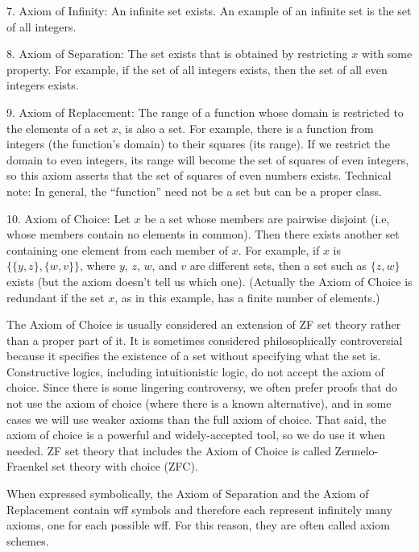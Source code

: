 7. Axiom of Infinity:  An infinite set exists.  An example of an infinite
   set is the set of all
   integers.

8. Axiom of Separation:  The set exists that is obtained by restricting $x$
   with some property.  For example, if the set of all integers exists,
   then the set of all even integers exists.

9. Axiom of Replacement:  The range of a function whose domain is restricted
   to the elements of a set $x$, is also a set.  For example, there
   is a function
   from integers (the function's domain) to their squares (its
   range).  If we
   restrict the domain to even integers, its range will become the set of
   squares of even integers, so this axiom asserts that the set of
    squares of even numbers exists.  Technical note:  In general, the
   ``function'' need not be a set but can be a proper class.

10. Axiom of Choice:  Let $x$ be a set whose members are pairwise
  disjoint (i.e,
  whose members contain no elements in common).  Then there exists another
  set containing one element from each member of $x$.  For
  example, if $x$ is
  $\{\{y,z\},\{w,v\}\}$, where $y$, $z$, $w$, and $v$ are
  different sets, then a set such as $\{z,w\}$
  exists (but the axiom doesn't tell
  us which one).  (Actually the Axiom
  of Choice is redundant if the set $x$, as in this example, has a finite
  number of elements.)

The Axiom of Choice is usually considered an extension of ZF set theory rather
than a proper part of it.  It is sometimes considered philosophically
controversial because it specifies the existence of a set without specifying
what the set is. Constructive logics, including intuitionistic logic,
do not accept the axiom of choice.
Since there is some lingering controversy, we often prefer proofs that do
not use the axiom of choice (where there is a known alternative), and
in some cases we will use weaker axioms than the full axiom of choice.
That said, the axiom of choice is a powerful and widely-accepted tool,
so we do use it when needed.
ZF set theory that includes the Axiom of Choice is
called Zermelo-Fraenkel set theory with choice (ZFC).

When expressed symbolically, the Axiom of Separation and the Axiom of
Replacement contain wff symbols and therefore each represent infinitely many
axioms, one for each possible wff. For this reason, they are often called
axiom schemes.

